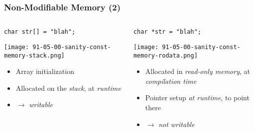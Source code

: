 \begin{frame}
  \frametitle{Non-Modifiable Memory (2)}

  \begin{columns}[t]

    \begin{column}{.36\textwidth}

      \texttt{char str[] = "blah";}

      \begin{block}{}
        \texttt{[image: 91-05-00-sanity-const-memory-stack.png]}
      \end{block}

      \begin{itemize}
      \item Array initialization
      \item Allocated on the \textit{stack}, at \textit{runtime}
      \item $\to$ \textit{writable}
      \end{itemize}

    \end{column}

    \begin{column}{.54\textwidth}

      \texttt{char *str = "blah";}

      \begin{block}{}
        \texttt{[image: 91-05-00-sanity-const-memory-rodata.png]}
      \end{block}

      \begin{itemize}
      \item Allocated in \textit{read-only memory}, at
        \textit{compilation time}
      \item Pointer setup \textit{at runtime}, to point there
      \item $\to$ \alert{\textit{not writable}}
      \end{itemize}

    \end{column}

  \end{columns}

\end{frame}

